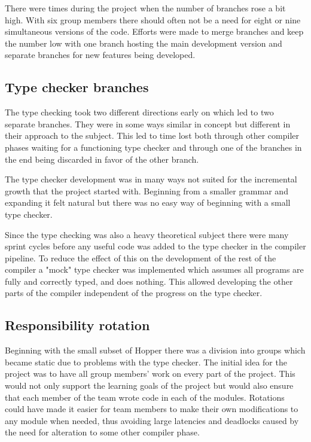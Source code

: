 There were times during the project when the number of branches rose a bit high. With six group members there should often not be a need for eight or nine simultaneous versions of the code. Efforts were made to merge branches and keep the number low with one branch hosting the main development version and separate branches for new features being developed.

\subsection{Type checker branches}

The type checking took two different directions early on which led to two separate branches. They were in some ways similar in concept but different in their approach to the subject. This led to time lost both through other compiler phases waiting for a functioning type checker and through one of the branches in the end being discarded in favor of the other branch. 

The type checker development was in many ways not suited for the incremental growth that the project started with. Beginning from a smaller grammar and expanding it felt natural but there was no easy way of beginning with a small type checker. 

Since the type checking was also a heavy theoretical subject there were many sprint cycles before any useful code was added to the type checker in the compiler pipeline. To reduce the effect of this on the development of the rest of the compiler a "mock" type checker was implemented which assumes all programs are fully and correctly typed, and does nothing. This allowed developing the other parts of the compiler independent of the progress on the type checker.


\subsection{Responsibility rotation}

Beginning with the small subset of Hopper there was a division into groups which became static due to problems with the type checker.
The initial idea for the project was to have all group members' work on every part of the project. This would not only support the learning goals of the project but would also ensure that each member of the team wrote code in each of the modules. Rotations could have made it easier for team members to make their own modifications to any module when needed, thus avoiding large latencies and deadlocks caused by the need for alteration to some other compiler phase. 

